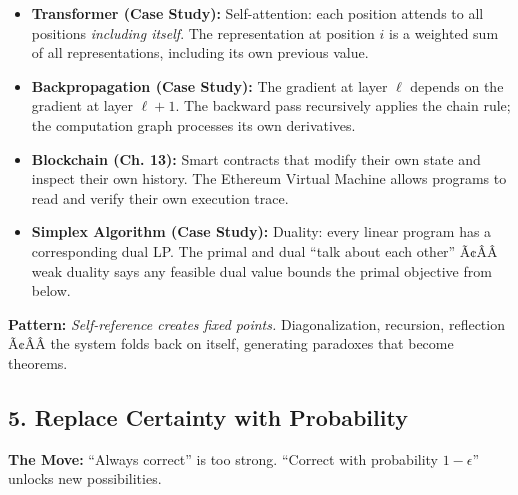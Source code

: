 \begin{itemize}
\item \textbf{Transformer (Case Study):} Self-attention: each position attends to all positions \emph{including itself}. The representation at position $i$ is a weighted sum of all representations, including its own previous value.

\item \textbf{Backpropagation (Case Study):} The gradient at layer $\ell$ depends on the gradient at layer $\ell+1$. The backward pass recursively applies the chain rule; the computation graph processes its own derivatives.

\item \textbf{Blockchain (Ch. 13):} Smart contracts that modify their own state and inspect their own history. The Ethereum Virtual Machine allows programs to read and verify their own execution trace.

\item \textbf{Simplex Algorithm (Case Study):} Duality: every linear program has a corresponding dual LP. The primal and dual ``talk about each other'' Ã¢ÂÂ weak duality says any feasible dual value bounds the primal objective from below.
\end{itemize}

\begin{mentalLeap}\textbf{Pattern:} \emph{Self-reference creates fixed points.} Diagonalization, recursion, reflection Ã¢ÂÂ the system folds back on itself, generating paradoxes that become theorems.\end{mentalLeap}
\subsection{5. Replace Certainty with Probability}
\label{sec:anatomy:probability}

\textbf{The Move:} ``Always correct'' is too strong. ``Correct with probability $1-\epsilon$'' unlocks new possibilities.

